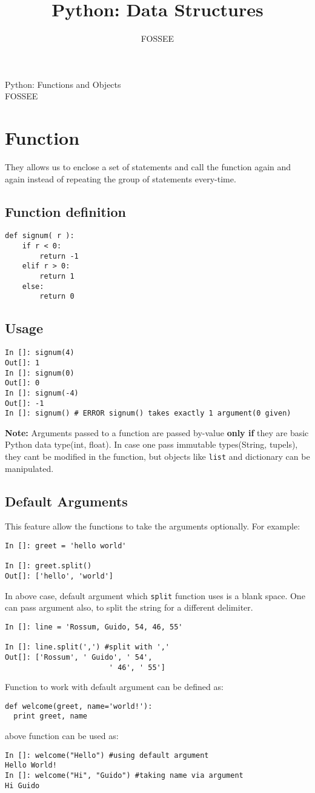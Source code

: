 \documentclass[12pt]{article}
\title{Python: Data Structures}
\author{FOSSEE}
\newcommand{\typ}[1]{\lstinline{#1}}
\begin{document}
\date{}
\vspace{-1in}
\begin{center}
\LARGE{Python: Functions and Objects}\\
\large{FOSSEE}
\end{center}
\section{Function}
They allows us to enclose a set of statements and call the function again and again instead of repeating the group of statements every-time. 
\subsection{Function definition}
  \begin{lstlisting}
def signum( r ):    
    if r < 0:
        return -1
    elif r > 0:
        return 1
    else:
        return 0
  \end{lstlisting}
\subsection{Usage}
\begin{lstlisting}
In []: signum(4)
Out[]: 1
In []: signum(0)
Out[]: 0
In []: signum(-4)
Out[]: -1
In []: signum() # ERROR signum() takes exactly 1 argument(0 given)
\end{lstlisting}
\textbf{Note:} Arguments passed to a function are passed by-value \textbf{only if} they are basic Python data type(int, float). In case one pass immutable types(String, tupels), they cant be modified in the function, but objects like \typ{list} and dictionary can be manipulated.
\subsection{Default Arguments}
This feature allow the functions to take the arguments optionally. For example:
\begin{lstlisting}
In []: greet = 'hello world'

In []: greet.split()
Out[]: ['hello', 'world']
\end{lstlisting}
In above case, default argument which \typ{split} function uses is a blank space. One can pass argument also, to split the string for a different delimiter.
\begin{lstlisting}
In []: line = 'Rossum, Guido, 54, 46, 55'

In []: line.split(',') #split with ','
Out[]: ['Rossum', ' Guido', ' 54',
                        ' 46', ' 55']
\end{lstlisting}
Function to work with default argument can be defined as:
\begin{lstlisting}
def welcome(greet, name='world!'):
  print greet, name
\end{lstlisting}
above function can be used as:
\begin{lstlisting}
In []: welcome("Hello") #using default argument
Hello World!
In []: welcome("Hi", "Guido") #taking name via argument
Hi Guido
\end{lstlisting}
\end{document}
